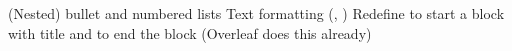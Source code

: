 \markdownRendererInterblockSeparator
{}\markdownRendererUlBegin
\markdownRendererUlItem (Nested) bullet and numbered lists\markdownRendererUlItemEnd 
\markdownRendererUlItem Text formatting (, )\markdownRendererUlItemEnd 
\markdownRendererUlItem Redefine \markdownRendererStrongEmphasis{\texthash\texthash\texthash\texthash} to start a block with title \linebreak and \markdownRendererStrongEmphasis{\texttt{-{}-{}-{}-}} to end the block\markdownRendererUlItemEnd 
\markdownRendererUlItem {} (Overleaf does this already)\markdownRendererUlItemEnd 
\markdownRendererUlEnd \markdownRendererInterblockSeparator
{}\markdownRendererHorizontalRule{}\relax